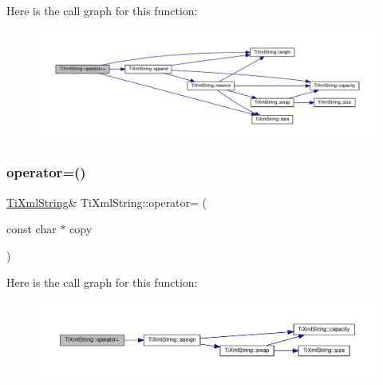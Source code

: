 Here is the call graph for this function\+:\nopagebreak
\begin{figure}[H]
\begin{center}
\leavevmode
\includegraphics[width=350pt]{class_ti_xml_string_afdcae5ea2b4d9e194dc21226b817f417_cgraph}
\end{center}
\end{figure}
\mbox{\label{class_ti_xml_string_ae0bc6147afc0ec2aa0da3a3c0a8fcfb0}} 
\subsubsection{\texorpdfstring{operator=()}{operator=()}\hspace{0.1cm}{\footnotesize\ttfamily [1/2]}}
{\footnotesize\ttfamily \hyperlink{class_ti_xml_string}{Ti\+Xml\+String}\& Ti\+Xml\+String\+::operator= (\begin{DoxyParamCaption}\item[{const char $\ast$}]{copy }\end{DoxyParamCaption})\hspace{0.3cm}{\ttfamily [inline]}}

Here is the call graph for this function\+:\nopagebreak
\begin{figure}[H]
\begin{center}
\leavevmode
\includegraphics[width=350pt]{class_ti_xml_string_ae0bc6147afc0ec2aa0da3a3c0a8fcfb0_cgraph}
\end{center}
\end{figure}
\mbox{\label{class_ti_xml_string_ab1f1f5d3eceaa0f22d0a7e6055ea81b0}} 
